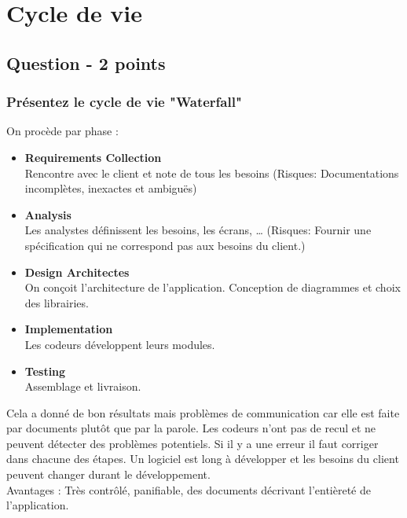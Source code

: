 \section{Cycle de vie}



\subsection{Question - 2 points}



\subsubsection{Présentez le cycle de vie "Waterfall"}
\textcolor[rgb]{0,0.48,0.58}{On procède par phase :}
\begin{itemize}
\color[rgb]{0,0.48,0.58}
	\item \textbf{Requirements Collection}
    \\Rencontre avec le client et note de tous les besoins (Risques: Documentations incomplètes, inexactes et ambiguës)

	\item \textbf{Analysis}
    \\Les analystes définissent les besoins, les écrans, … (Risques: Fournir une spécification qui ne correspond pas aux besoins du client.)

	\item \textbf{Design Architectes}
    \\On conçoit l'architecture de l'application. Conception de diagrammes et choix des librairies.

	\item \textbf{Implementation}
    \\Les codeurs développent leurs modules.

	\item \textbf{Testing}
    \\Assemblage et livraison.
\end{itemize}
\textcolor[rgb]{0,0.48,0.58}{Cela a donné de bon résultats mais problèmes de communication car elle est faite par documents plutôt que par la parole. Les codeurs n'ont pas de recul et ne peuvent détecter des problèmes potentiels. Si il y a une erreur il faut corriger dans chacune des étapes. Un logiciel est long à développer et les besoins du client peuvent changer durant le développement.
\\Avantages : Très contrôlé, panifiable, des documents décrivant l'entièreté de l'application.}



